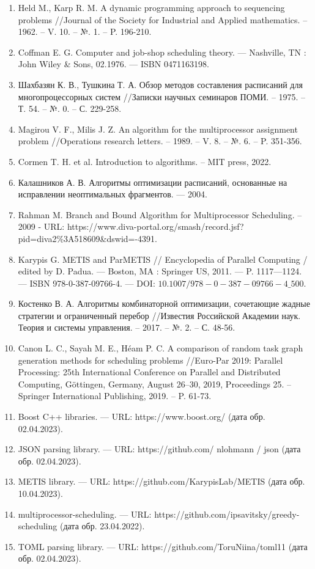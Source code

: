\documentclass[12pt]{article}
\newcommand{\intro}[1]{
    \stepcounter{section}
    \section*{\hfillПРИЛОЖЕНИЕ \arabic{section}}
    \begin{center}
        \bf{#1}
    \end{center}
    \markboth{\MakeUppercase{#1}}{}
    \addcontentsline{toc}{section}{Приложение \arabic{section}. #1}
}
\begin{document}
\begin{enumerate}
    \item Held M., Karp R. M. A dynamic programming approach to sequencing problems //Journal of the Society for Industrial and Applied mathematics. – 1962. – V. 10. – №. 1. – P. 196-210.
    \item Coffman E. G. Computer and job-shop scheduling theory. — Nashville, TN : John Wiley
    \& Sons, 02.1976. — ISBN 0471163198.
    \item Шахбазян К. В., Тушкина Т. А. Обзор методов составления расписаний для многопроцессорных систем //Записки научных семинаров ПОМИ. – 1975. – Т. 54. – №. 0. – С. 229-258.
    \item Magirou V. F., Milis J. Z. An algorithm for the multiprocessor assignment problem //Operations research letters. – 1989. – V. 8. – №. 6. – P. 351-356.
    \item Cormen T. H. et al. Introduction to algorithms. – MIT press, 2022.
    \item Калашников А. В. Алгоритмы оптимизации расписаний, основанные на исправлении
    неоптимальных фрагментов. — 2004.
    \item Rahman M. Branch and Bound Algorithm for Multiprocessor Scheduling. – 2009 - URL: https://www.diva-portal.org/smash/record.jsf?pid=diva2\%3A518609\&dswid=-4391.
    \item Karypis G. METIS and ParMETIS // Encyclopedia of Parallel Computing / edited by D.
    Padua. — Boston, MA : Springer US, 2011. — P. 1117—1124. — ISBN 978-0-387-09766-4. —
    DOI: $10.1007/978-0-387-09766-4\_500$.
    \item Костенко В. А. Алгоритмы комбинаторной оптимизации, сочетающие жадные стратегии и ограниченный перебор //Известия Российской Академии наук. Теория и системы управления. – 2017. – №. 2. – С. 48-56.
    \item Canon L. C., Sayah M. E., Héam P. C. A comparison of random task graph generation methods for scheduling problems //Euro-Par 2019: Parallel Processing: 25th International Conference on Parallel and Distributed Computing, Göttingen, Germany, August 26–30, 2019, Proceedings 25. – Springer International Publishing, 2019. – P. 61-73.
    \item Boost C++ libraries. — URL: https://www.boost.org/ (дата обр. 02.04.2023).
    \item JSON parsing library. — URL: https://github.com/ nlohmann / json (дата обр.
    02.04.2023).
    \item METIS library. — URL: https://github.com/KarypisLab/METIS (дата обр. 10.04.2023).
    \item multiprocessor-scheduling. — URL: https://github.com/ipsavitsky/greedy-scheduling
    (дата обр. 23.04.2022).
    \item TOML parsing library. — URL: https://github.com/ToruNiina/toml11 (дата обр.
02.04.2023).

\end{enumerate}

\appendix

% 
\end{document}
